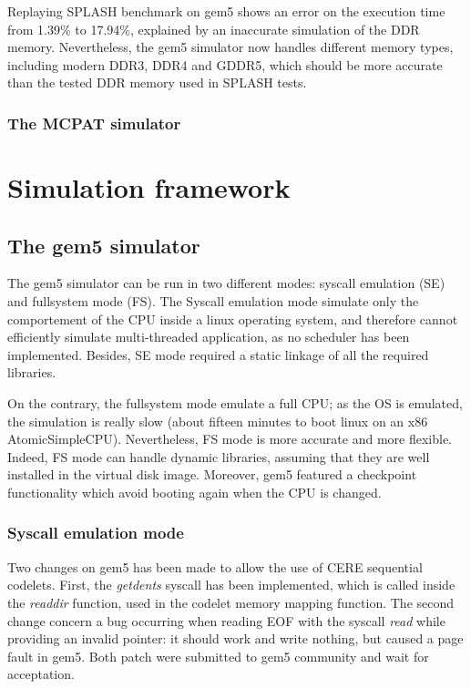 \documentclass{article}
\begin{document}
\begin{multicols}{2}
Replaying SPLASH benchmark on gem5 shows an error on the execution time from 1.39\% to 17.94\%, explained by an inaccurate simulation of the DDR memory. Nevertheless, the gem5 simulator now handles different memory types, including modern DDR3, DDR4 and GDDR5, which should be more accurate than the tested DDR memory used in SPLASH tests\cite{DBLP:conf/recosoc/ButkoGOS12}.


\subsubsection*{The MCPAT simulator}



\section{Simulation framework}
\label{sim}

\subsection{The gem5 simulator}

The gem5 simulator can be run in two different modes: syscall emulation (SE) and fullsystem mode (FS). The Syscall emulation mode simulate only the comportement of the CPU inside a linux operating system, and therefore cannot efficiently simulate multi-threaded application, as no scheduler has been implemented. Besides, SE mode required a static linkage of all the required libraries.

On the contrary, the fullsystem mode emulate a full CPU; as the OS is emulated, the simulation is really slow (about fifteen minutes to boot linux on an x86 AtomicSimpleCPU). Nevertheless, FS mode is more accurate and more flexible. Indeed, FS mode can handle dynamic libraries, assuming that they are well installed in the virtual disk image. 
Moreover, gem5 featured a checkpoint functionality which avoid booting again when the CPU is changed. %
\subsubsection{Syscall emulation mode}
Two changes on gem5 has been made to allow the use of CERE sequential codelets. First, the \textit{getdents} syscall has been implemented, which is called inside the \textit{readdir} function, used in the codelet memory mapping function. The second change concern a bug occurring when reading EOF with the syscall \textit{read} while providing an invalid pointer: it should work and write nothing, but caused a page fault in gem5. Both patch were submitted to gem5 community and wait for acceptation.


\end{multicols}
\end{document}
